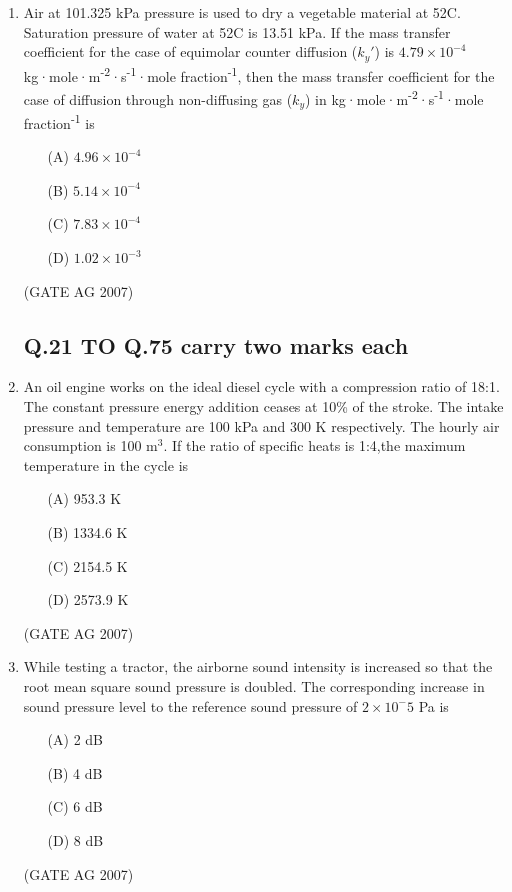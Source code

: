 \documentclass[journal,12pt,onecolumn]{IEEEtran}
\theoremstyle{remark}
\begin{document}
\begin{enumerate}[label=Q\arabic*:]
\item  Air at 101.325 kPa pressure is used to dry a vegetable material at 52\degree C. Saturation pressure of water at 52\degree C is 13.51 kPa. If the mass transfer coefficient for the case of equimolar counter diffusion ($k_y'$) is $4.79 \times 10^{-4}$ kg·mole·m\textsuperscript{-2}·s\textsuperscript{-1}·mole fraction\textsuperscript{-1}, then the mass transfer coefficient for the case of diffusion through non-diffusing gas ($k_y$) in kg·mole·m\textsuperscript{-2}·s\textsuperscript{-1}·mole fraction\textsuperscript{-1} is
\begin{multicols}{4}
\begin{enumerate}
    \item[(A)] $4.96 \times 10^{-4}$
    \item[(B)] $5.14 \times 10^{-4}$
    \item[(C)] $7.83 \times 10^{-4}$
    \item[(D)] $1.02 \times 10^{-3}$
\end{enumerate}
\end{multicols}
\hfill(GATE AG 2007)



 \subsection*{Q.21 TO Q.75 carry two marks each}

\item  An oil engine works on the ideal diesel cycle with a compression ratio of 18:1. The constant pressure energy addition ceases at 10\% of the stroke. The intake pressure and temperature are 100 kPa and 300 K respectively. The hourly air consumption is 100 m$^3$. If the ratio of specific heats is 1:4,the maximum temperature in the cycle is 
\begin{multicols}{4}
\begin{enumerate}
    \item [(A)] 953.3 K
    \item [(B)] 1334.6 K
    \item [(C)] 2154.5 K
    \item [(D)] 2573.9 K
\end{enumerate}
\end{multicols}
\hfill(GATE AG 2007)

\item  While testing a tractor, the airborne sound intensity is increased so that the root mean square sound pressure is doubled. The corresponding increase in sound pressure level to the reference sound pressure of $2 \times 10^-5$ Pa is
\begin{multicols}{4}
\begin{enumerate}
    \item [(A)] 2 dB
    \item [(B)] 4 dB
    \item [(C)] 6 dB
    \item [(D)] 8 dB
\end{enumerate}
\end{multicols}
\hfill(GATE AG 2007)


\end{enumerate}
\end{document}
